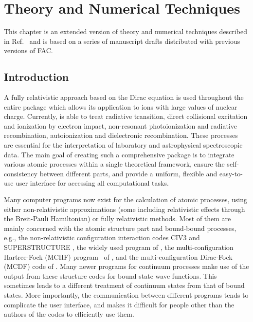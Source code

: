 \chapter{Theory and Numerical Techniques}
\label{ch:theory}

This chapter is an extended version of theory and numerical techniques described
in Ref.~\cite{gu:2008a} and is based on a series of manuscript drafts
distributed with previous versions of FAC.

\section{Introduction}

A fully relativistic approach based on
the Dirac equation is used throughout the entire package which allows its
application to ions with large values of nuclear charge. Currently, \cFAC
is able to treat radiative transition, direct collisional excitation and
ionization by electron impact, non-resonant photoionization and radiative
recombination, autoionization and dielectronic recombination. These processes
are essential for the interpretation of laboratory and astrophysical 
spectroscopic data. The main goal of creating such a comprehensive package is
to integrate various atomic processes within a single theoretical framework,
ensure the self-consistency between different parts, and provide a uniform,
flexible and easy-to-use user interface for accessing all computational tasks. 

Many computer programs now exist for the calculation of atomic processes, using
either non-relativistic approximations (some including relativistic effects
through the Breit-Pauli Hamiltonian) or fully relativistic methods. Most of them
are mainly concerned with the atomic structure part and bound-bound processes,
e.g., the non-relativistic configuration interaction codes CIV3
\cite{hibbert:1975a} and SUPERSTRUCTURE \cite{eissner:1974a}, the widely used
program of \citet{cowan:1981a}, the multi-configuration Hartree-Fock (MCHF)
program~\cite{fischer:1997a} of \citet{fischer:2000a}, and the
multi-configuration Dirac-Fock (MCDF) code of \citet{grant:1980a}. Many newer
programs for continuum processes make use of the output from these structure
codes for bound state wave functions. This sometimes leads to a different
treatment of continuum states from that of bound states. More importantly, the
communication between different programs tends to complicate the user interface,
and makes it difficult for people other than the authors of the codes to
efficiently use them. 

